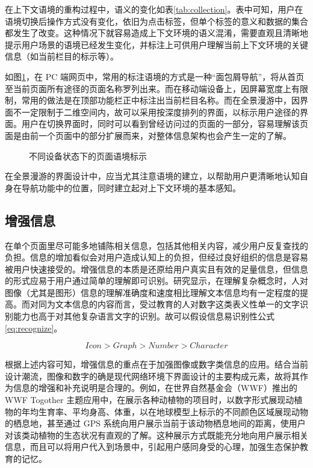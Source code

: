 在上下文语境的重构过程中，语义的变化如表\ref{tab:collection}。表中可知，用户在语境切换后操作方式没有变化，依旧为点击标签，但单个标签的意义和数据的集合都发生了改变。这种情况下就容易造成上下文环境的语义混淆，需要直观且清晰地提示用户场景的语境已经发生变化，并标注上可供用户理解当前上下文环境的关键信息（如当前栏目的标示等）。

如图\ref{fig:tab}，在 PC 端网页中，常用的标注语境的方式是一种“面包屑导航”，将从首页至当前页面所有途径的页面名称罗列出来。而在移动端设备上，因屏幕宽度上有限制，常用的做法是在顶部功能栏正中标注出当前栏目名称。而在全景漫游中，因界面不一定限制于二维空间内，故可以采用按深度排列的界面，以标示用户途径的界面。用户在切换界面时，同时可以看到曾经访问过的页面的一部分，容易理解该页面是由前一个页面中的部分扩展而来，对整体信息架构也会产生一定的了解。

\begin{figure}[htp]
\centering
{}
\caption{不同设备状态下的页面语境标示}
\label{fig:tab}
\end{figure}

在全景漫游的界面设计中，应当尤其注意语境的建立，以帮助用户更清晰地认知自身在导航功能中的位置，同时建立起对上下文环境的基本感知。

\subsection{增强信息}
在单个页面里尽可能多地铺陈相关信息，包括其他相关内容，减少用户反复查找的负担。信息的增加看似会对用户造成认知上的负担，但经过良好组织的信息是容易被用户快速接受的。增强信息的本质是还原给用户真实且有效的足量信息，但信息的形式应易于用户通过简单的理解即可识别。研究显示，在理解复杂概念时，人对图像（尤其是图形）信息的理解准确度和速度相比理解文本信息均有一定程度的提高。而对同为文本信息的内容而言，受过教育的人对数字这类表义性单一的文字识别能力也高于对其他复杂语言文字的识别。故可以假设信息易识别性公式 \ref{eq:recognize}。

\begin{equation}
Icon > Graph > Number > Character 
\label{eq:recognize}
\end{equation}

根据上述内容可知，增强信息的重点在于加强图像或数字类信息的应用。结合当前设计潮流，图像和数字的确是现代网络环境下界面设计的主要构成元素，故将其作为信息的增强和补充说明是合理的。例如，在世界自然基金会（WWF）推出的 WWF Togother 主题应用中，在展示各种动植物的项目时，以数字形式展现动植物的年均生育率、平均身高、体重，以在地球模型上标示的不同颜色区域展现动物的栖息地，甚至通过 GPS 系统向用户展示当前于该动物栖息地间的距离，使用户对该类动植物的生态状况有直观的了解。这种展示方式既能充分地向用户展示相关信息，而且可以将用户代入到场景中，引起用户感同身受的心理，加强生态保护教育的记忆。

